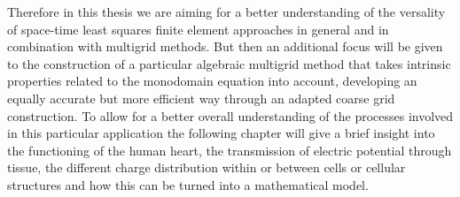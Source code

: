 \documentclass[../draft_1.tex]{subfiles}
\begin{document}
Therefore in this thesis we are aiming for a better understanding of the versality of space-time least squares finite element approaches in general and in combination with multigrid methods. But then an additional focus will be given to the construction of a particular algebraic multigrid method that takes intrinsic properties related to the monodomain equation into account, developing an equally accurate but more efficient way through an adapted coarse grid construction. To allow for a better overall understanding of the processes involved in this particular application the following chapter will give a brief insight into the functioning of the human heart, the transmission of electric potential through tissue, the different charge distribution within or between cells or cellular structures and how this can be turned into a mathematical model. 
\end{document}
